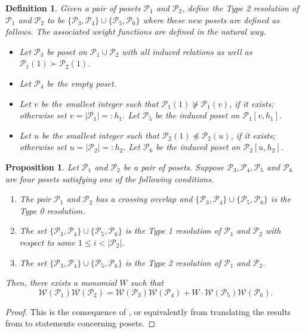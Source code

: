 \documentclass[12pt, letterpaper,table]{amsart}
\newtheorem{definition}[theorem]{Definition}
\newtheorem{prop}[theorem]{Proposition}
\theoremstyle{remark}
\newcommand{\calP}{\mathcal{P}}
\begin{document}
\begin{definition}\label{def:Type2Resolution}
Given a pair of posets $\calP_1$ and $\calP_2$, define the \emph{Type 2 resolution} of $\calP_1$ and $\calP_2$ to be $\{\calP_3, \calP_4\} \cup \{\calP_5, \calP_6\}$ where these new posets are defined as follows. The associated weight functions are defined in the natural way. \begin{itemize}
    \item  Let $\calP_3$  be poset on $\calP_1 \cup \calP_2$ with all induced relations as well as $\calP_1(1) \succ \calP_2(1)$.
    \item Let $\calP_4$ be the empty poset. 
    \item Let $v$ be the smallest integer such that $\calP_1(1) \not\succeq  \calP_1(v)$, if it exists; otherwise set $v = \vert \calP_1 \vert=:h_1$. Let $\calP_5$ be the induced poset on $\calP_1[v,h_1]$.
    \item Let $u$ be the smallest integer such that $\calP_2(1) \not\preceq  \calP_2(u)$, if it exists; otherwise set $u = \vert \calP_2 \vert=:h_2$. Let $\calP_6$ be the induced poset on $\calP_2[u,h_2]$.
\end{itemize}
\end{definition}

\begin{prop}\label{prop:SkeinRelationsOnPosets}
Let $\calP_1$ and $\calP_2$ be a pair of posets. Suppose $\calP_3,\calP_4,\calP_5$ and $\calP_6$ are four posets satisfying one of the following conditions.
\begin{enumerate}
    \item The pair $\calP_1$ and $\calP_2$ has a crossing overlap and $\{\calP_3,\calP_4\} \cup \{\calP_5,\calP_6\}$ is the Type 0 resolution.
    \item The set $\{\calP_3,\calP_4\} \cup \{\calP_5,\calP_6\}$ is the Type 1 resolution of $\calP_1$ and $\calP_2$ with respect to some $1 \leq i < \vert \calP_2 \vert$.
    \item The set $\{\calP_3,\calP_4\} \cup \{\calP_5,\calP_6\}$ is the Type 2 resolution of $\calP_1$ and $\calP_2$. 
\end{enumerate}
Then, there exists a monomial $W$ such that  \[
\mathcal{W}(\calP_1) \mathcal{W}(\calP_2)  = \mathcal{W}(\calP_3) \mathcal{W}(\calP_4)  + W \cdot \mathcal{W}(\calP_5) \mathcal{W}(\calP_6) .
\]
\end{prop}

\begin{proof}
This is the consequence of \cite[Propositions 6,7,8]{banaian2024skein}, or equivalently from translating the results from \cite{CS13} to statements concerning posets.
\end{proof}
\end{document}
